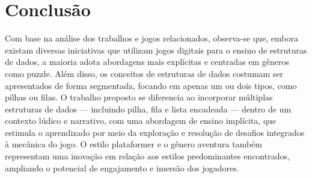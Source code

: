 \section{Conclusão}

Com base na análise dos trabalhos e jogos relacionados, observa-se que, embora existam diversas iniciativas que utilizam jogos digitais para o ensino de estruturas de dados, a maioria adota abordagens mais explícitas e centradas em gêneros como puzzle.
Além disso, os conceitos de estruturas de dados costumam ser apresentados de forma segmentada, focando em apenas um ou dois tipos, como pilhas ou filas.
O trabalho proposto se diferencia ao incorporar múltiplas estruturas de dados — incluindo pilha, fila e lista encadeada — dentro de um contexto lúdico e narrativo, com uma abordagem de ensino implícita, que estimula o aprendizado por meio da exploração e resolução de desafios integrados à mecânica do jogo.
O estilo plataformer e o gênero aventura também representam uma inovação em relação aos estilos predominantes encontrados, ampliando o potencial de engajamento e imersão dos jogadores.

